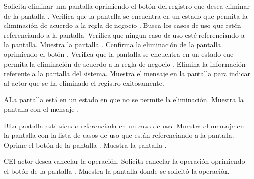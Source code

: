  \begin{UCtrayectoria}
    \UCpaso[\UCactor] Solicita eliminar una pantalla oprimiendo el botón \btnEliminar del registro que desea eliminar de la pantalla .
    \UCpaso[\UCsist] Verifica que la pantalla se encuentra en un estado que permita la eliminación de acuerdo a la regla de negocio . 
    \UCpaso[\UCsist] Busca los casos de uso que estén referenciando a la pantalla.
    \UCpaso[\UCsist] Verifica que ningún caso de uso esté referenciando a la pantalla. 
    \UCpaso[\UCsist] Muestra la pantalla . 
    \UCpaso[\UCactor] Confirma la eliminación de la pantalla oprimiendo el botón . 
    \UCpaso[\UCsist] Verifica que la pantalla se encuentra en un estado que permita la eliminación de acuerdo a la regla de negocio . 
    \UCpaso[\UCsist] Elimina la información referente a la pantalla del sistema.
    \UCpaso[\UCsist] Muestra el mensaje  en la pantalla 
    para indicar al actor que se ha eliminado el registro exitosamente.
 \end{UCtrayectoria}
 
 \begin{UCtrayectoriaA}{A}{La pantalla está en un estado en que no se permite la eliminación.}
    \UCpaso[\UCsist] Muestra la pantalla  con el mensaje .
 \end{UCtrayectoriaA} 
 \begin{UCtrayectoriaA}{B}{La pantalla está siendo referenciada en un caso de uso.}
    \UCpaso[\UCsist] Muestra el mensaje  en la pantalla 
    con la lista de casos de uso que están referenciando a la pantalla.
    \UCpaso[\UCactor] Oprime el botón  de la pantalla .
    \UCpaso[\UCsist] Muestra la pantalla .
 \end{UCtrayectoriaA}
 \begin{UCtrayectoriaA}{C}{El actor desea cancelar la operación.}
    \UCpaso[\UCactor] Solicita cancelar la operación oprimiendo el botón  de la pantalla .
    \UCpaso[\UCsist] Muestra la pantalla donde se solicitó la operación.
 \end{UCtrayectoriaA} 